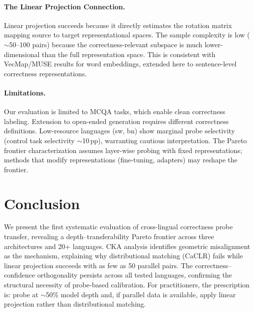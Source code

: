 \documentclass[11pt,a4paper]{article}
\begin{document}
\paragraph{The Linear Projection Connection.}
Linear projection succeeds because it directly estimates the rotation matrix mapping source to target representational spaces. The sample complexity is low ($\sim$50--100 pairs) because the correctness-relevant subspace is much lower-dimensional than the full representation space. This is consistent with VecMap/MUSE results for word embeddings, extended here to sentence-level correctness representations.

\paragraph{Limitations.}
Our evaluation is limited to MCQA tasks, which enable clean correctness labeling. Extension to open-ended generation requires different correctness definitions. Low-resource languages (sw, bn) show marginal probe selectivity (control task selectivity $\sim$10\,pp), warranting cautious interpretation. The Pareto frontier characterization assumes layer-wise probing with fixed representations; methods that modify representations (fine-tuning, adapters) may reshape the frontier.

\section{Conclusion}
\label{sec:conclusion}

We present the first systematic evaluation of cross-lingual correctness probe transfer, revealing a depth--transferability Pareto frontier across three architectures and 20+ languages. CKA analysis identifies geometric misalignment as the mechanism, explaining why distributional matching (CaCLR) fails while linear projection succeeds with as few as 50 parallel pairs. The correctness--confidence orthogonality persists across all tested languages, confirming the structural necessity of probe-based calibration. For practitioners, the prescription is: probe at $\sim$50\% model depth and, if parallel data is available, apply linear projection rather than distributional matching.



\end{document}
